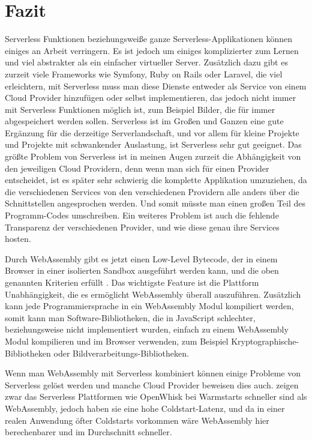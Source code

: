 \section{Fazit}

Serverless Funktionen beziehungsweiße ganze Serverless-Applikationen können einiges an Arbeit verringern. Es ist jedoch um einiges komplizierter zum Lernen und viel abstrakter als ein einfacher virtueller Server. Zusätzlich dazu gibt es zurzeit viele Frameworks wie Symfony, Ruby on Rails oder Laravel, die viel erleichtern, mit Serverless muss man diese Dienste entweder als Service von einem Cloud Provider hinzufügen oder selbst implementieren, das jedoch nicht immer mit Serverless Funktionen möglich ist, zum Beispiel Bilder, die für immer abgespeichert werden sollen. Serverless ist im Großen und Ganzen eine gute Ergänzung für die derzeitige Serverlandschaft, und vor allem für kleine Projekte und Projekte mit schwankender Auslastung, ist Serverless sehr gut geeignet. Das größte Problem von Serverless ist in meinen Augen zurzeit die Abhängigkeit von den jeweiligen Cloud Providern, denn wenn man sich für einen Provider entscheidet, ist es später sehr schwierig die komplette Applikation umzuziehen, da die verschiedenen Services von den verschiedenen Providern alle anders über die Schnittstellen angesprochen werden. Und somit müsste man einen großen Teil des Programm-Codes umschreiben. Ein weiteres Problem ist auch die fehlende Transparenz der verschiedenen Provider, und wie diese genau ihre Services hosten.

Durch WebAssembly gibt es jetzt einen Low-Level Bytecode, der in einem Browser in einer isolierten Sandbox ausgeführt werden kann, und die oben genannten Kriterien erfüllt \autocite[]{Haas2017}. Das wichtigste Feature ist die Plattform Unabhängigkeit, die es ermöglicht WebAssembly überall auszuführen. Zusätzlich kann jede Programmiersprache in ein WebAssembly Modul kompiliert werden, somit kann man Software-Bibliotheken, die in JavaScript schlechter, beziehungsweise nicht implementiert wurden, einfach zu einem WebAssembly Modul kompilieren und im Browser verwenden, zum Beispiel Kryptographische-Bibliotheken \autocite[]{Renner} oder Bildverarbeitungs-Bibliotheken.

Wenn man WebAssembly mit Serverless kombiniert können einige Probleme von Serverless gelöst werden \autocite[]{Baldini} und manche Cloud Provider beweisen dies auch. \cite{Hall2019} zeigen zwar das Serverless Plattformen wie OpenWhisk bei Warmstarts schneller sind als WebAssembly, jedoch haben sie eine hohe Coldstart-Latenz, und da in einer realen Anwendung öfter Coldstarts vorkommen wäre WebAssembly hier berechenbarer und im Durchschnitt schneller.